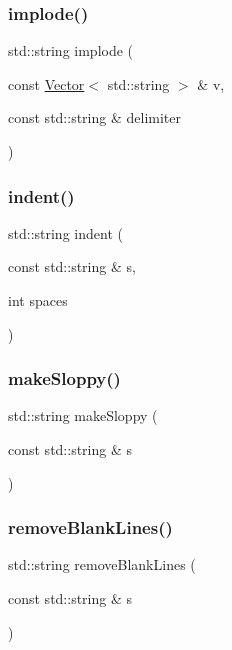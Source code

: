 \subsubsection{\texorpdfstring{implode()}{implode()}}
{\footnotesize\ttfamily std\+::string implode (\begin{DoxyParamCaption}\item[{const \mbox{\hyperlink{classVector}{Vector}}$<$ std\+::string $>$ \&}]{v,  }\item[{const std\+::string \&}]{delimiter }\end{DoxyParamCaption})}

\mbox{\label{namespacestringutils_afa26297e6041901fc89ea21f251c5bd3}} 
\subsubsection{\texorpdfstring{indent()}{indent()}}
{\footnotesize\ttfamily std\+::string indent (\begin{DoxyParamCaption}\item[{const std\+::string \&}]{s,  }\item[{int}]{spaces }\end{DoxyParamCaption})}

\mbox{\label{namespacestringutils_a3f3b01bff686e3495c275bcb492ec4d6}} 
\subsubsection{\texorpdfstring{make\+Sloppy()}{makeSloppy()}}
{\footnotesize\ttfamily std\+::string make\+Sloppy (\begin{DoxyParamCaption}\item[{const std\+::string \&}]{s }\end{DoxyParamCaption})}

\mbox{\label{namespacestringutils_a65dad9d06071c45572573015f34e6841}} 
\subsubsection{\texorpdfstring{remove\+Blank\+Lines()}{removeBlankLines()}}
{\footnotesize\ttfamily std\+::string remove\+Blank\+Lines (\begin{DoxyParamCaption}\item[{const std\+::string \&}]{s }\end{DoxyParamCaption})}

